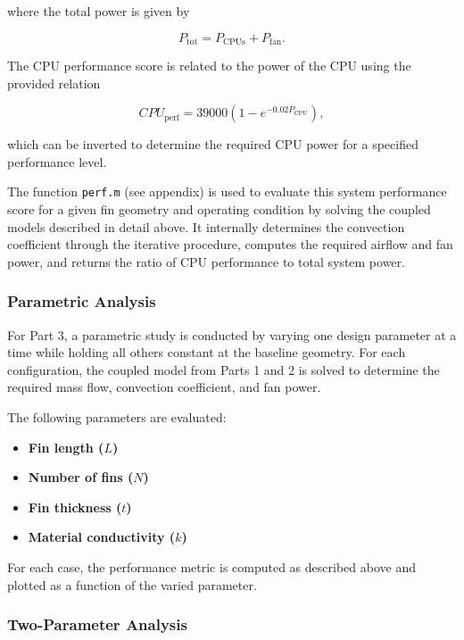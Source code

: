 \documentclass[12pt, titlepage]{article}
\begin{document}
where the total power is given by

\begin{equation}
P_{\text{tot}} = P_{\text{CPUs}} + P_{\text{fan}}.
\end{equation}


The CPU performance score is related to the power of the CPU using the provided relation

\begin{equation}
CPU_{\text{perf}} = 39000\left(1 - e^{-0.02P_{\text{CPU}}}\right),
\label{eq:ref}
\end{equation}

which can be inverted to determine the required CPU power for a specified performance level. 

The function \texttt{perf.m} (see appendix) is used to evaluate this system performance score for a given fin geometry and operating condition by solving the coupled models described in detail above. It internally determines the convection coefficient through the iterative procedure, computes the required airflow and fan power, and returns the ratio of CPU performance to total system power.

\subsubsection{Parametric Analysis}

For Part 3, a parametric study is conducted by varying one design parameter at a time while holding all others constant at the baseline geometry. For each configuration, the coupled model from Parts 1 and 2 is solved to determine the required mass flow, convection coefficient, and fan power.

The following parameters are evaluated:

\begin{itemize}
    \item \textbf{Fin length ($L$)} 
    \item \textbf{Number of fins ($N$)} 
    \item \textbf{Fin thickness ($t$)} 
    \item \textbf{Material conductivity ($k$)}
\end{itemize}

For each case, the performance metric is computed as described above and plotted as a function of the varied parameter.

\subsubsection{Two-Parameter Analysis}
\end{document}
